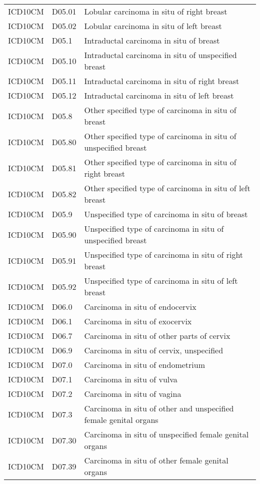 \begin{longtable}{p{}p{}p{}}
  ICD10CM & D05.01 & Lobular carcinoma in situ of right breast \\ 
  ICD10CM & D05.02 & Lobular carcinoma in situ of left breast \\ 
  ICD10CM & D05.1 & Intraductal carcinoma in situ of breast \\ 
  ICD10CM & D05.10 & Intraductal carcinoma in situ of unspecified breast \\ 
  ICD10CM & D05.11 & Intraductal carcinoma in situ of right breast \\ 
  ICD10CM & D05.12 & Intraductal carcinoma in situ of left breast \\ 
  ICD10CM & D05.8 & Other specified type of carcinoma in situ of breast \\ 
  ICD10CM & D05.80 & Other specified type of carcinoma in situ of unspecified breast \\ 
  ICD10CM & D05.81 & Other specified type of carcinoma in situ of right breast \\ 
  ICD10CM & D05.82 & Other specified type of carcinoma in situ of left breast \\ 
  ICD10CM & D05.9 & Unspecified type of carcinoma in situ of breast \\ 
  ICD10CM & D05.90 & Unspecified type of carcinoma in situ of unspecified breast \\ 
  ICD10CM & D05.91 & Unspecified type of carcinoma in situ of right breast \\ 
  ICD10CM & D05.92 & Unspecified type of carcinoma in situ of left breast \\ 
  ICD10CM & D06.0 & Carcinoma in situ of endocervix \\ 
  ICD10CM & D06.1 & Carcinoma in situ of exocervix \\ 
  ICD10CM & D06.7 & Carcinoma in situ of other parts of cervix \\ 
  ICD10CM & D06.9 & Carcinoma in situ of cervix, unspecified \\ 
  ICD10CM & D07.0 & Carcinoma in situ of endometrium \\ 
  ICD10CM & D07.1 & Carcinoma in situ of vulva \\ 
  ICD10CM & D07.2 & Carcinoma in situ of vagina \\ 
  ICD10CM & D07.3 & Carcinoma in situ of other and unspecified female genital organs \\ 
  ICD10CM & D07.30 & Carcinoma in situ of unspecified female genital organs \\ 
  ICD10CM & D07.39 & Carcinoma in situ of other female genital organs \\ 

\end{longtable}
